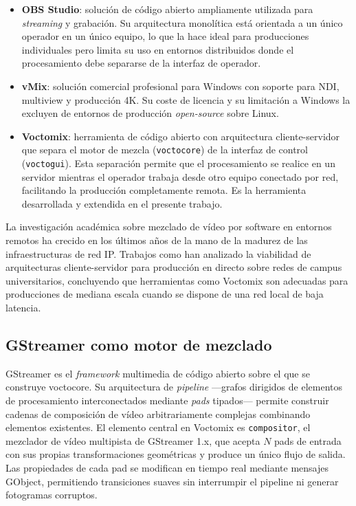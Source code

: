 \begin{itemize}
  \item \textbf{OBS Studio}: solución de código abierto ampliamente utilizada para
  \textit{streaming} y grabación. Su arquitectura monolítica está orientada a un único
  operador en un único equipo, lo que la hace ideal para producciones individuales pero
  limita su uso en entornos distribuidos donde el procesamiento debe separarse de la
  interfaz de operador.

  \item \textbf{vMix}: solución comercial profesional para Windows con soporte para
  NDI, multiview y producción 4K. Su coste de licencia y su limitación a Windows la
  excluyen de entornos de producción \textit{open-source} sobre Linux.

  \item \textbf{Voctomix}: herramienta de código abierto con arquitectura
  cliente-servidor que separa el motor de mezcla (\texttt{voctocore}) de la interfaz
  de control (\texttt{voctogui}). Esta separación permite que el procesamiento se
  realice en un servidor mientras el operador trabaja desde otro equipo conectado por
  red, facilitando la producción completamente remota. Es la herramienta desarrollada
  y extendida en el presente trabajo.
\end{itemize}

La investigación académica sobre mezclado de vídeo por software en entornos remotos
ha crecido en los últimos años de la mano de la madurez de las infraestructuras de
red IP. Trabajos como \cite{XXX} han analizado la viabilidad de arquitecturas
cliente-servidor para producción en directo sobre redes de campus universitarios,
concluyendo que herramientas como Voctomix son adecuadas para producciones de mediana
escala cuando se dispone de una red local de baja latencia.

\subsection{GStreamer como motor de mezclado}

GStreamer es el \textit{framework} multimedia de código abierto sobre el que se
construye voctocore. Su arquitectura de \textit{pipeline} ---grafos dirigidos de
elementos de procesamiento interconectados mediante \textit{pads} tipados--- permite
construir cadenas de composición de vídeo arbitrariamente complejas combinando
elementos existentes. El elemento central en Voctomix es \texttt{compositor}, el
mezclador de vídeo multipista de GStreamer 1.x, que acepta $N$ pads de entrada con
sus propias transformaciones geométricas y produce un único flujo de salida. Las
propiedades de cada pad se modifican en tiempo real mediante mensajes GObject,
permitiendo transiciones suaves sin interrumpir el pipeline ni generar fotogramas
corruptos.
